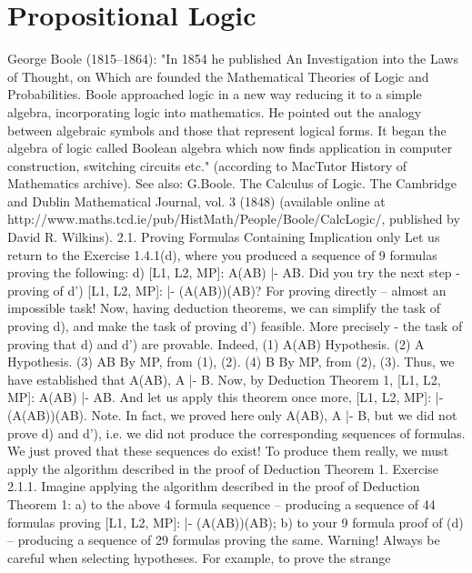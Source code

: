 \section{Propositional Logic}

George Boole (1815--1864): "In 1854 he published An Investigation into the Laws of Thought, on Which are founded the
Mathematical Theories of Logic and Probabilities. Boole approached logic in a new way reducing it to a simple algebra,
incorporating logic into mathematics. He pointed out the analogy between algebraic symbols and those that represent logical
forms. It began the algebra of logic called Boolean algebra which now finds application in computer construction, switching
circuits etc." (according to MacTutor History of Mathematics archive).
See also:
G.Boole. The Calculus of Logic. The Cambridge and Dublin Mathematical Journal, vol. 3 (1848) (available online at
http://www.maths.tcd.ie/pub/HistMath/People/Boole/CalcLogic/, published by David R. Wilkins).
2.1. Proving Formulas Containing Implication only
Let us return to the Exercise 1.4.1(d), where you produced a sequence of 9 formulas proving the
following:
d) [L1, L2, MP]: A\IMPLIES (A\IMPLIES B) |- A\IMPLIES B.
Did you try the next step - proving of
d') [L1, L2, MP]: |- (A\IMPLIES (A\IMPLIES B))\IMPLIES (A\IMPLIES B)?
For proving directly – almost an impossible task!
Now, having deduction theorems, we can simplify the task of proving d), and make the task of proving d')
feasible. More precisely - the task of proving that d) and d') are provable. Indeed,
(1) A\IMPLIES (A\IMPLIES B) Hypothesis.
(2) A Hypothesis.
(3) A\IMPLIES B By MP, from (1), (2).
(4) B By MP, from (2), (3).
Thus, we have established that A\IMPLIES (A\IMPLIES B), A |- B. Now, by Deduction Theorem 1,
[L1, L2, MP]: A\IMPLIES (A\IMPLIES B) |- A\IMPLIES B.
And let us apply this theorem once more,
[L1, L2, MP]: |- (A\IMPLIES (A\IMPLIES B))\IMPLIES (A\IMPLIES B).
Note. In fact, we proved here only A\IMPLIES (A\IMPLIES B), A |- B, but we did not prove d) and d'), i.e. we did not
produce the corresponding sequences of formulas. We just proved that these sequences do exist! To
produce them really, we must apply the algorithm described in the proof of Deduction Theorem 1.
Exercise 2.1.1. Imagine applying the algorithm described in the proof of Deduction Theorem 1: a) to the
above 4 formula sequence – producing a sequence of 44 formulas proving [L1, L2, MP]: |-
(A\IMPLIES (A\IMPLIES B))\IMPLIES (A\IMPLIES B); b) to your 9 formula proof of (d) – producing a sequence of 29 formulas proving
the same.
Warning! Always be careful when selecting hypotheses. For example, to prove the strange

